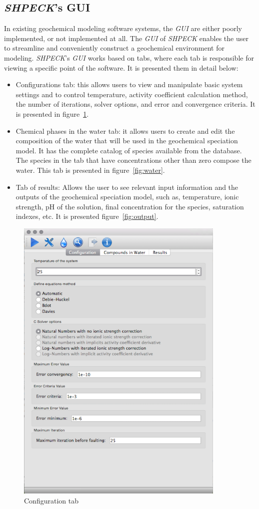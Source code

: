 \subsection{\emph{SHPECK}'s GUI}
In existing geochemical modeling software systems, the \emph{GUI} are either poorly implemented, or not implemented at all. The \emph{GUI} of \emph{SHPECK} enables the user to streamline and conveniently construct a geochemical environment for modeling. \emph{SHPECK}'s \emph{GUI} works based on tabs, where each tab is responsible for viewing a specific point of the software. It is presented them in detail below:
\begin{itemize}
\item Configurations tab: this allows users to view and manipulate basic system settings and to control temperature, activity coefficient calculation method, the number of iterations, solver options, and error and convergence criteria. It is presented in  figure~\ref{fig:config}.
\item Chemical phases in the water tab: it allows users to create and edit the composition of the water that will be used in the geochemical speciation model. It has the complete catalog of species available from the database. The species in the tab that have concentrations other than zero compose the water. This tab is presented in figure~\ref{fig:water}.
\item Tab of results: Allows the user to see relevant input information and the outputs of the geochemical speciation model, such as, temperature, ionic strength, pH of the solution, final concentration for the species, saturation indexes, etc. It is presented  figure~\ref{fig:output}.
\end{itemize}


\begin{figure}[ht!]
\centering
\includegraphics[width=100mm]{figures/shpeck-configtab.png}
\caption{Configuration tab}
\label{fig:config}
\end{figure}

